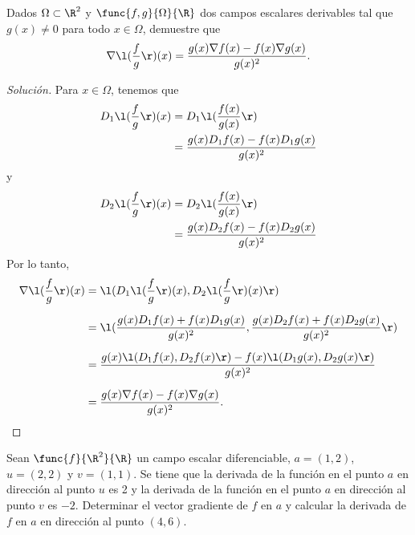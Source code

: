 \documentclass[a4,11pt]{aleph-notas}
\begin{document}
\begin{ejer}
Dados $\Omega\subset \R^2$ y $\func{f,g}{\Omega}{\R}$ dos campos escalares derivables tal que $g(x)\neq 0$ para todo $x\in \Omega$, demuestre que
    \[
        \nabla\l(\frac{f}{g}\r)(x)=\frac{g(x)\nabla f(x)-f(x)\nabla g(x)}{g(x)^2}.
    \]
\end{ejer}

\begin{proof}[Solución]
Para $x\in\Omega$, tenemos que
    \begin{align*}
        D_1\l(\frac{f}{g}\r)(x)
            & = D_1 \l(\frac{f(x)}{g(x)}\r) \\
            & = \frac{g(x) D_1 f(x)  - f(x) D_1g(x)}{g(x)^2}
    \end{align*}
    y
    \begin{align*}
        D_2\l(\frac{f}{g}\r)(x)
            & = D_2\l(\frac{f(x)}{g(x)}\r) \\
            & = \frac{g(x) D_2f(x) - f(x) D_2g(x)}{g(x)^2}
    \end{align*}
    Por lo tanto,
    \begin{align*}
        \nabla\l(\frac{f}{g}\r)(x)
            & = \l(D_1\l(\frac{f}{g}\r)(x),D_2\l(\frac{f}{g}\r)(x) \r)\\[2mm]
            & = \l( \frac{g(x)D_1 f(x) + f(x)D_1g(x)}{g(x)^2} , \frac{g(x)D_2 f(x) + f(x)D_2g(x)}{g(x)^2} \r)\\[2mm]
            & = \frac{g(x)\l(D_1f(x),D_2f(x)\r) - f(x)\l(D_1g(x),D_2g(x)\r)}{g(x)^2}\\[2mm]
            & = \frac{g(x)\nabla f(x)-f(x)\nabla g(x)}{g(x)^2}.\qedhere
    \end{align*}
\end{proof}

\begin{ejer}
Sean $\func{f}{\R^2}{\R}$ un campo escalar diferenciable, $a=(1,2)$, $u=(2,2)$ y $v=(1,1)$. Se tiene que la derivada de la función en el punto $a$ en dirección al punto $u$ es 2 y la derivada de la función en el punto $a$ en dirección al punto $v$ es $-2$. Determinar el vector gradiente de $f$ en $a$ y calcular la derivada de $f$ en $a$ en dirección al punto $(4,6)$.
\end{ejer}
\end{document}
